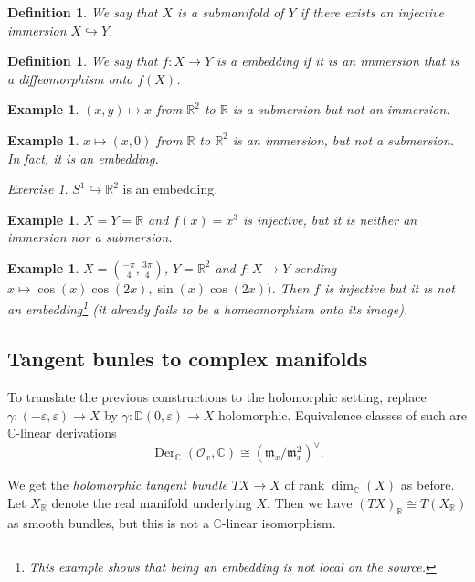 \documentclass[12pt]{article}
\theoremstyle{darkgreentheorem}
\theoremstyle{darkbluedefinition}
\newtheorem{defn}[thm]{Definition}
\theoremstyle{darkredexample}
\newtheorem{exa}[thm]{Example}
\theoremstyle{remark}
\newtheorem{exe}[thm]{Exercise}
\newcommand{\R}{\mathbb{R}}
\newcommand{\1}{\mathbbm{1}}
\newcommand{\C}{\mathbb{C}}
\newcommand{\bbD}{\mathbb{D}}
\renewcommand{\O}{\mathcal{O}}
\newcommand{\m}{\mathfrak{m}}
\DeclareMathOperator{\Der}{Der}
\newcommand{\dual}{^{\vee}}
\newcommand{\mono}{\hookrightarrow}
\begin{document}
\begin{defn}
    We say that $X$ is a \textit{submanifold} of $Y$ if there exists an injective immersion $X\mono Y$.
\end{defn}

\begin{defn}
    We say that $f\colon X\to Y$ is a \textit{embedding} if it is an immersion that is a diffeomorphism onto $f(X)$.
\end{defn}

\begin{exa}
    $(x,y)\mapsto x$ from $\R^{2}$ to $\R$ is a submersion but not an immersion.
\end{exa}

\begin{exa}
    $x\mapsto (x,0)$ from $\R$ to $\R^{2}$ is an immersion, but not a submersion.
    In fact, it is an embedding.
\end{exa}

\begin{exe}
    $S^{1}\mono \R^{2}$ is an embedding.
\end{exe}

\begin{exa}
    $X=Y=\R$ and $f(x)=x^{3}$ is injective, but it is neither an immersion nor a submersion.
\end{exa}

\begin{exa}
    $X=(\frac{-\pi}{4},\frac{3\pi}{4})$, $Y=\R^{2}$ and $f\colon X\to Y$ sending $x\mapsto \cos(x)\cos(2x),\sin(x)\cos(2x))$.
    Then $f$ is injective but it is not an embedding\footnote{This example shows that being an embedding is not local on the source.} (it already fails to be a homeomorphism onto its image).
\end{exa}

\subsection{Tangent bunles to complex manifolds}

To translate the previous constructions to the holomorphic setting, replace $\gamma\colon (-\varepsilon,\varepsilon)\to X$ by $\gamma\colon \bbD(0,\varepsilon)\to X$ holomorphic.
Equivalence classes of such are $\C$-linear derivations
\[ \Der_{\C}(\O_{x},\C)\cong (\m_{x}/\m_{x}^{2})\dual. \]

We get the \textit{holomorphic tangent bundle} $TX\to X$ of rank $\dim_{\C}(X)$ as before.
Let $X_{\R}$ denote the real manifold underlying $X$.
Then we have $(TX)_{\R}\cong T(X_{\R})$ as smooth bundles, but this is not a $\C$-linear isomorphism.
\end{document}
